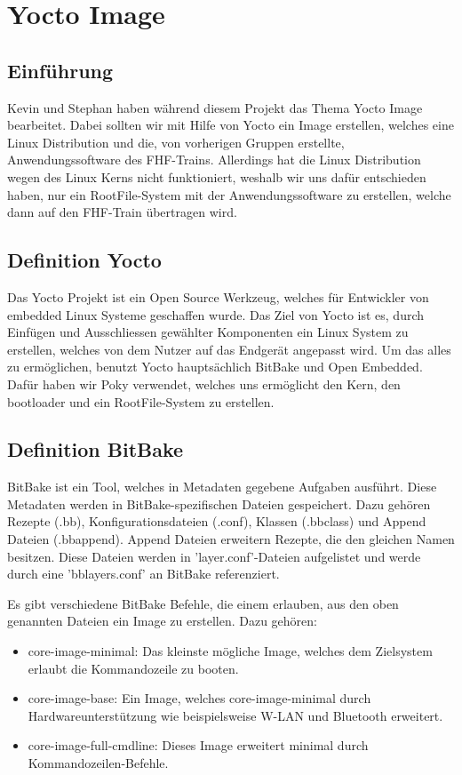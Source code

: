 \documentclass[a4paper,10pt] {article}
\begin{document}
\section{Yocto Image}
\subsection{Einführung}

	Kevin und Stephan haben während diesem Projekt das Thema Yocto Image bearbeitet. Dabei sollten wir mit Hilfe von Yocto ein Image erstellen, welches eine Linux Distribution und die, von 
	vorherigen Gruppen erstellte, Anwendungssoftware des FHF-Trains.
	Allerdings hat die Linux Distribution wegen des Linux Kerns nicht funktioniert, weshalb wir uns dafür entschieden haben, nur ein RootFile-System mit der Anwendungssoftware zu erstellen,
	welche dann auf den FHF-Train übertragen wird.

\subsection{Definition Yocto}

	Das Yocto Projekt ist ein Open Source Werkzeug, welches für Entwickler von embedded Linux Systeme geschaffen wurde. Das Ziel von Yocto ist es, durch Einfügen und Ausschliessen
	gewählter Komponenten ein Linux System zu erstellen, welches von dem Nutzer auf das Endgerät angepasst wird. Um das alles zu ermöglichen, benutzt Yocto hauptsächlich BitBake und
	Open Embedded. Dafür haben wir Poky verwendet, welches uns ermöglicht den Kern, den bootloader und ein RootFile-System zu erstellen.
	
\subsection{Definition BitBake}
	
	BitBake ist ein Tool, welches in Metadaten gegebene Aufgaben ausführt. Diese Metadaten werden in BitBake-spezifischen Dateien gespeichert. Dazu gehören Rezepte (.bb),
	Konfigurationsdateien (.conf), Klassen (.bbclass) und Append Dateien (.bbappend). Append Dateien erweitern Rezepte, die den gleichen Namen besitzen. Diese Dateien werden in
	'layer.conf'-Dateien aufgelistet und werde durch eine 'bblayers.conf' an  BitBake referenziert.

	Es gibt verschiedene BitBake Befehle, die einem erlauben, aus den oben genannten Dateien ein Image zu erstellen. Dazu gehören:
	\begin{itemize}
	\item core-image-minimal: Das kleinste mögliche Image, welches dem Zielsystem erlaubt die Kommandozeile zu booten.
	\item core-image-base: Ein Image, welches core-image-minimal durch Hardwareunterstützung wie beispielsweise W-LAN und Bluetooth erweitert.
	\item core-image-full-cmdline: Dieses Image erweitert minimal durch Kommandozeilen-Befehle.
	\end{itemize}
\end{document}
